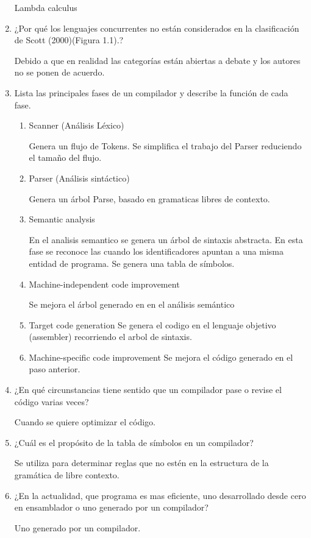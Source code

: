 \documentclass{article}
\begin{document}
\begin{enumerate}
	Lambda calculus
	
	\item ¿Por qué los lenguajes concurrentes no están considerados en la clasificación de Scott (2000)(Figura 1.1).?
	
Debido a que en realidad las categorías están abiertas a debate y los autores no se ponen de acuerdo.	
	
	\item Lista las principales fases de un compilador y describe la función de cada fase.
	
	\begin{enumerate}
	\item Scanner (Análisis Léxico)
	
		Genera un flujo de Tokens. Se simplifica el trabajo del Parser reduciendo el tamaño del flujo.
	\item Parser (Análisis sintáctico)
	
		Genera un árbol Parse, basado en gramaticas libres de contexto.
	
	\item Semantic analysis
	
		En el analisis semantico se genera un árbol de sintaxis abstracta. En esta fase se reconoce las cuando los identificadores apuntan a una misma entidad de programa. Se genera una tabla de símbolos.  
		
	\item Machine-independent code improvement 
	
		Se mejora el árbol generado en en el análisis semántico
	\item Target code generation
		Se genera el codigo en el lenguaje objetivo (assembler) recorriendo el arbol de sintaxis.
	
	\item Machine-specific code improvement 
		Se mejora el código generado en el paso anterior.
	\end{enumerate}
	
	\item ¿En qué circunstancias tiene sentido que un compilador pase o revise el código varias veces?

Cuando se quiere optimizar el código.	
	
	\item ¿Cuál es el propósito de la tabla de símbolos en un compilador?
	
	Se utiliza para determinar reglas que no estén en la estructura de la gramática de libre contexto.	
	
	\item ¿En la actualidad, que programa es mas eficiente, uno desarrollado desde cero en ensamblador o uno generado por un compilador?
	
Uno generado por un compilador.	
	
	\end{enumerate}
\end{document}
